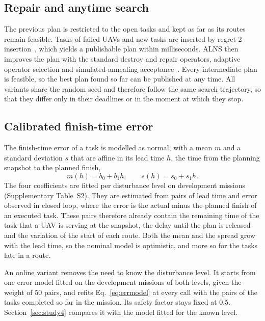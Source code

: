 \documentclass[a4paper,fleqn]{cas-dc}
\begin{document}
\subsection{Repair and anytime search}
The previous plan is restricted to the open tasks and kept as far as its routes remain feasible. Tasks of failed UAVs
and new tasks are inserted by regret-2 insertion~\cite{ropke2006adaptive}, which yields a publishable plan within
milliseconds. ALNS then improves the plan with the standard destroy and repair operators, adaptive operator selection
and simulated-annealing acceptance~\cite{ropke2006adaptive,mara2022alns}. Every intermediate plan is feasible, so the
best plan found so far can be published at any time. All variants share the random seed and therefore follow the same
search trajectory, so that they differ only in their deadlines or in the moment at which they stop.

\subsection{Calibrated finish-time error}
The finish-time error of a task is modelled as normal, with a mean $m$ and a standard deviation $s$ that are affine in
its lead time $h$, the time from the planning snapshot to the planned finish,
\begin{equation}\label{eq:errmodel}
m(h)=b_0+b_1h,\qquad s(h)=s_0+s_1h .
\end{equation}
The four coefficients are fitted per disturbance level on development missions (Supplementary
Table~S2). They are estimated from pairs of lead time and error observed in closed loop, where the
error is the actual minus the planned finish of an executed task. These pairs therefore already contain the remaining
time of the task that a UAV is serving at the snapshot, the delay until the plan is released and the variation of the
start of each route. Both the mean and the spread grow with the lead time, so the nominal model is optimistic, and more
so for the tasks late in a route.

An online variant removes the need to know the disturbance level. It starts from one error model fitted on the
development missions of both levels, given the weight of 50 pairs, and refits Eq.~\eqref{eq:errmodel} at every call with
the pairs of the tasks completed so far in the mission. Its safety factor stays fixed at 0.5. Section~\ref{sec:study4}
compares it with the model fitted for the known level.
\end{document}
